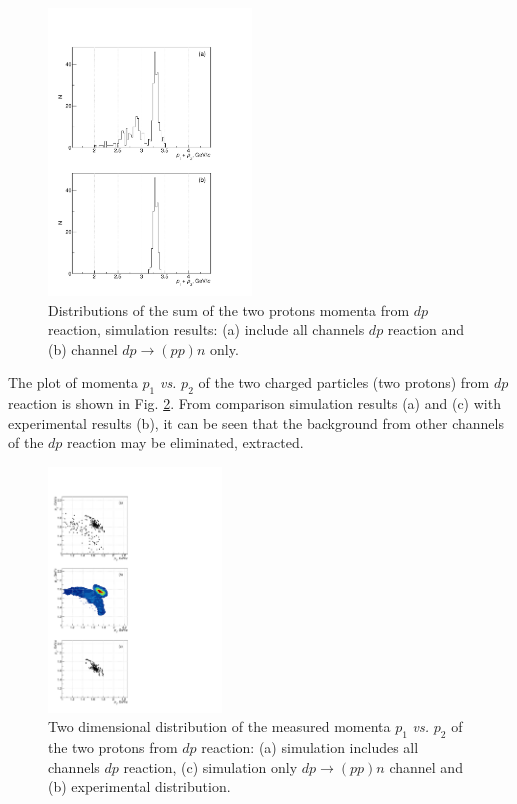 \documentclass[twocolumn,epjc3]{svjour3}
\newcommand{\dpchex} {\ensuremath{dp \rightarrow (pp)n}\xspace}
\begin{document}
\begin{figure}[h]
  \centering
  \includegraphics[width=0.48\textwidth]{p1_plus_p2_2.pdf}
  \caption{Distributions of the sum of the two protons momenta from $dp$
    reaction, simulation results: (a) include all channels $dp$ reaction and (b)
    channel \dpchex only.}
  \label{fig:p1p2sim}
\end{figure}

The plot of momenta $p_1$ \textit{vs.} $p_2$ of the two charged particles (two
protons) from $dp$ reaction is shown in Fig. \ref{fig:p1vsp2}. From comparison
simulation results (a) and (c) with experimental results (b), it can be seen
that the background from other channels of the $dp$ reaction may be eliminated,
extracted.

\begin{figure}[t]
  \centering
  \includegraphics[width=0.41\textwidth]{p1_vs_p2_1.pdf} %
  \caption{Two dimensional distribution of the measured momenta $p_1$
    \textit{vs.} $p_2$ of the two protons from $dp$ reaction: (a) simulation
    includes all channels $dp$ reaction, (c) simulation only \dpchex channel and
    (b) experimental distribution.}
  \label{fig:p1vsp2}
\end{figure}
\end{document}
